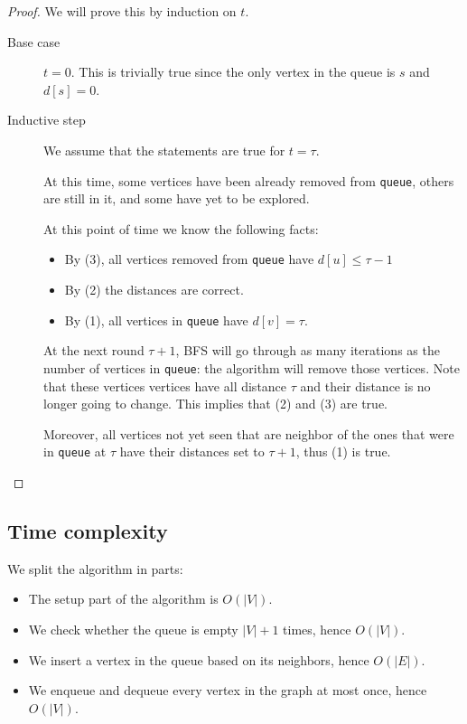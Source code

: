 \documentclass[12pt]{extarticle}
\begin{document}
\begin{proof}
    We will prove this by induction on $t$.

    \begin{description}
        \item[Base case] $t = 0$.
              This is trivially true since the only vertex in the queue is $s$ and $d[s] = 0$.

        \item[Inductive step] We assume that the statements are true for $t = \tau$.

              At this time, some vertices have been already removed from \texttt{queue}, others are still in it, and some have yet to be explored.

              At this point of time we know the following facts:
              \begin{itemize}
                  \item By (3), all vertices removed from \texttt{queue} have $d[u] \leq \tau - 1$
                  \item By (2) the distances are correct.
                  \item By (1), all vertices in \texttt{queue} have $d[v] = \tau$.
              \end{itemize}

              At the next round $\tau + 1$, BFS will go through as many iterations as the number of vertices in \texttt{queue}: the algorithm will remove those vertices.
              Note that these vertices vertices have all distance $\tau$ and their distance is no longer going to change. This implies that (2) and (3) are true.

              Moreover, all vertices not yet seen that are neighbor of the ones that were in \texttt{queue} at $\tau$ have their distances set to $\tau + 1$, thus (1) is true.
    \end{description}
\end{proof}

\subsection{Time complexity}

We split the algorithm in parts:

\begin{itemize}
    \item The setup part of the algorithm is $O(|V|)$.
    \item We check whether the queue is empty $|V| + 1$ times, hence $O(|V|)$.
    \item We insert a vertex in the queue based on its neighbors, hence $O(|E|)$.
    \item We enqueue and dequeue every vertex in the graph at most once, hence $O(|V|)$.
\end{itemize}
\end{document}
